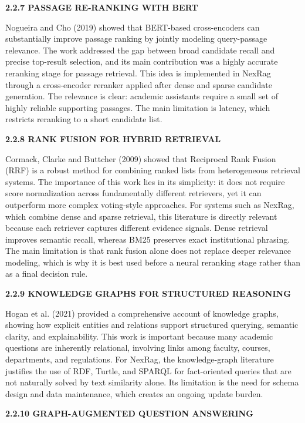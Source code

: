 \noindent\textbf{2.2.7 PASSAGE RE-RANKING WITH BERT}

Nogueira and Cho (2019) showed that BERT-based cross-encoders can substantially improve passage ranking by jointly modeling query-passage relevance. The work addressed the gap between broad candidate recall and precise top-result selection, and its main contribution was a highly accurate reranking stage for passage retrieval. This idea is implemented in NexRag through a cross-encoder reranker applied after dense and sparse candidate generation. The relevance is clear: academic assistants require a small set of highly reliable supporting passages. The main limitation is latency, which restricts reranking to a short candidate list.

\noindent\textbf{2.2.8 RANK FUSION FOR HYBRID RETRIEVAL}

Cormack, Clarke and Buttcher (2009) showed that Reciprocal Rank Fusion (RRF) is a robust method for combining ranked lists from heterogeneous retrieval systems. The importance of this work lies in its simplicity: it does not require score normalization across fundamentally different retrievers, yet it can outperform more complex voting-style approaches. For systems such as NexRag, which combine dense and sparse retrieval, this literature is directly relevant because each retriever captures different evidence signals. Dense retrieval improves semantic recall, whereas BM25 preserves exact institutional phrasing. The main limitation is that rank fusion alone does not replace deeper relevance modeling, which is why it is best used before a neural reranking stage rather than as a final decision rule.

\noindent\textbf{2.2.9 KNOWLEDGE GRAPHS FOR STRUCTURED REASONING}

Hogan et al. (2021) provided a comprehensive account of knowledge graphs, showing how explicit entities and relations support structured querying, semantic clarity, and explainability. This work is important because many academic questions are inherently relational, involving links among faculty, courses, departments, and regulations. For NexRag, the knowledge-graph literature justifies the use of RDF, Turtle, and SPARQL for fact-oriented queries that are not naturally solved by text similarity alone. Its limitation is the need for schema design and data maintenance, which creates an ongoing update burden.

\noindent\textbf{2.2.10 GRAPH-AUGMENTED QUESTION ANSWERING}

